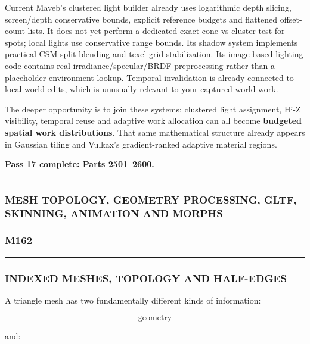 Current Maveb's clustered light builder already uses logarithmic depth slicing, screen/depth conservative bounds, explicit reference budgets and flattened offset-count lists. It does not yet perform a dedicated exact cone-vs-cluster test for spots; local lights use conservative range bounds. Its shadow system implements practical CSM split blending and texel-grid stabilization. Its image-based-lighting code contains real irradiance/specular/BRDF preprocessing rather than a placeholder environment lookup. Temporal invalidation is already connected to local world edits, which is unusually relevant to your captured-world work.

The deeper opportunity is to join these systems: clustered light assignment, Hi-Z visibility, temporal reuse and adaptive work allocation can all become \textbf{budgeted spatial work distributions}. That same mathematical structure already appears in Gaussian tiling and Vulkax's gradient-ranked adaptive material regions.

\textbf{Pass 17 complete: Parts 2501--2600.}

\begin{center}\rule{0.5\linewidth}{0.5pt}\end{center}

\subsubsection{MESH TOPOLOGY, GEOMETRY PROCESSING, GLTF, SKINNING, ANIMATION AND MORPHS}\label{mesh-topology-geometry-processing-gltf-skinning-animation-and-morphs}

\subsubsection{M162}\label{m162}

\begin{center}\rule{0.5\linewidth}{0.5pt}\end{center}

\subsubsection{INDEXED MESHES, TOPOLOGY AND HALF-EDGES}\label{indexed-meshes-topology-and-half-edges}

A triangle mesh has two fundamentally different kinds of information:

\[
\boxed{
\text{geometry}
}
\]

and:

